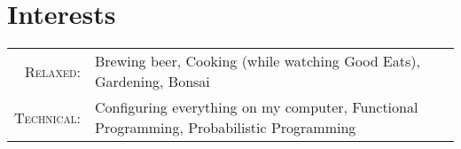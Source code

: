 \section{\texorpdfstring{\color{Blue}Interests}{Interests}}
\begin{tabular}{rl}
    \textsc{Relaxed:} & Brewing beer, Cooking (while watching Good Eats), Gardening, Bonsai\\
    \textsc{Technical:} & Configuring everything on my computer, Functional Programming, Probabilistic Programming \\
\end{tabular}
